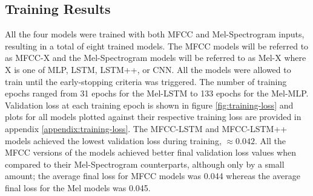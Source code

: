 \subsection{Training Results}
All the four models were trained with both MFCC and Mel-Spectrogram inputs, resulting in a total of eight trained models. The MFCC models will be referred to as MFCC-X and the Mel-Spectrogram models will be referred to as Mel-X where X is one of MLP, LSTM, LSTM++, or CNN. All the models were allowed to train until the early-stopping criteria was triggered. The number of training epochs ranged from 31 epochs for the Mel-LSTM to 133 epochs for the Mel-MLP.
Validation loss at each training epoch is shown in figure \ref{fig:training-loss} and plots for all models plotted against their respective training loss are provided in appendix \ref{appendix:training-loss}. The MFCC-LSTM and MFCC-LSTM++ models achieved the lowest validation loss during training, $\approx 0.042$. All the MFCC versions of the models achieved better final validation loss values when compared to their Mel-Spectrogram counterparts, although only by a small amount; the average final loss for MFCC models was 0.044 whereas the average final loss for the Mel models was 0.045.
